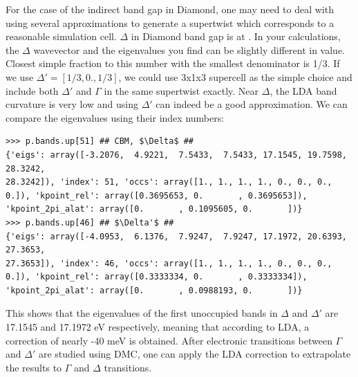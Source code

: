 For the case of the indirect band gap in Diamond, one may need to deal with using several approximations to generate a supertwist which corresponds to a reasonable simulation cell. 
$\Delta$ in Diamond band gap is at \ishell{[0.3695653, 0., 0.3695653]}. 
In your calculations, the $\Delta$ wavevector and the eigenvalues you find can be slightly different in value. 
Closest simple fraction to this number with the smallest denominator is 1/3. If we use $\Delta'=[1/3, 0., 1/3]$, we could use 3x1x3 supercell as the simple choice and include both $\Delta'$ and $\Gamma$ in the same supertwist exactly. 
Near  $\Delta$, the LDA band curvature is very low and using  $\Delta'$ can indeed be a good approximation. 
We can compare the eigenvalues using their index numbers:
\begin{lstlisting}[mathescape=true,style=Python]
>>> p.bands.up[51] ## CBM, $\Delta$ ##
{'eigs': array([-3.2076,  4.9221,  7.5433,  7.5433, 17.1545, 19.7598, 28.3242,
28.3242]), 'index': 51, 'occs': array([1., 1., 1., 1., 0., 0., 0., 0.]), 'kpoint_rel': array([0.3695653, 0.       , 0.3695653]), 'kpoint_2pi_alat': array([0.       , 0.1095605, 0.       ])}
>>> p.bands.up[46] ## $\Delta'$ ##
{'eigs': array([-4.0953,  6.1376,  7.9247,  7.9247, 17.1972, 20.6393, 27.3653,
27.3653]), 'index': 46, 'occs': array([1., 1., 1., 1., 0., 0., 0., 0.]), 'kpoint_rel': array([0.3333334, 0.       , 0.3333334]), 'kpoint_2pi_alat': array([0.       , 0.0988193, 0.       ])}
\end{lstlisting}
This shows that the eigenvalues of the first unoccupied bands in $\Delta$ and $\Delta'$ are 17.1545 and 17.1972 eV respectively, meaning that according to LDA, a correction of nearly -40 meV is obtained. 
After electronic transitions between $\Gamma$ and $\Delta'$ are studied using DMC, one can apply the LDA correction to extrapolate the results to $\Gamma$ and $\Delta$ transitions.

